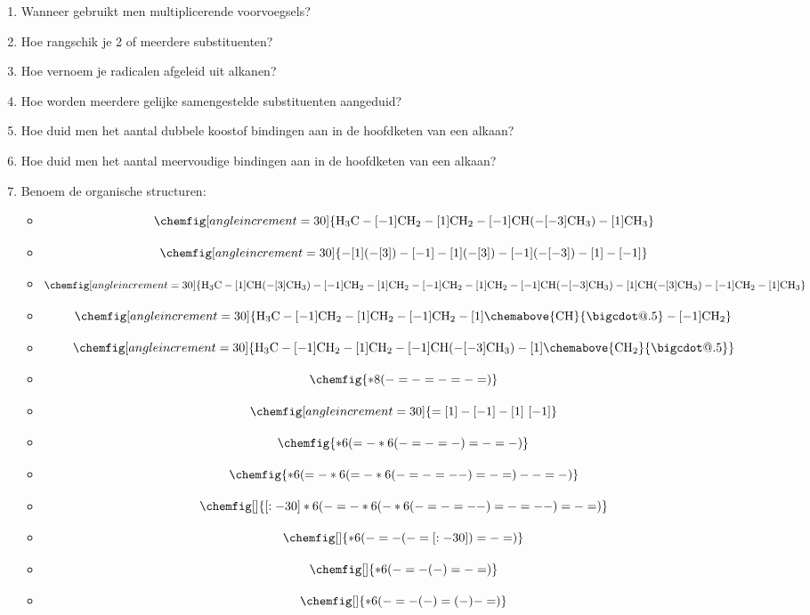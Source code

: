 \documentclass[a4paper,12pt]{article}
\makeatletter
\newcommand*\bigcdot{\mathpalette\bigcdot@{.5}}
\newcommand*\bigcdot@[2]{\mathbin{\vcenter{\hbox{\scalebox{#2}{$\m@th#1\bullet$}}}}}
\makeatother
\begin{document}
\begin{enumerate}
        \item Wanneer gebruikt men multiplicerende voorvoegsels?
        \item Hoe rangschik je 2 of meerdere substituenten?
        \item Hoe vernoem je radicalen afgeleid uit alkanen?
        \item Hoe worden meerdere gelijke samengestelde substituenten aangeduid? 
        \item Hoe duid men het aantal dubbele koostof bindingen aan in de hoofdketen van een alkaan?
        \item Hoe duid men het aantal meervoudige bindingen aan in de hoofdketen van een alkaan? 
        \item Benoem de organische structuren:
            \begin{itemize}
                \item $$\chemfig[angle increment=30]{\ce{H3C}-[-1]\ce{CH2}-[1]\ce{CH2}-[-1]\ce{CH}(-[-3]\ce{CH3})-[1]\ce{CH3}}$$
                \item $$\chemfig[angle increment=30]{-[1](-[3])-[-1]-[1](-[3])-[-1](-[-3])-[1]-[-1]}$$
                \item $$\chemfig[angle increment=30]{\ce{H3C}-[1]\ce{CH}(-[3]\ce{CH3})-[-1]\ce{CH2}-[1]\ce{CH2}-[-1]\ce{CH2}-[1]\ce{CH2}-[-1]\ce{CH}(-[-3]\ce{CH3})-[1]\ce{CH}(-[3]\ce{CH3})-[-1]\ce{CH2}-[1]\ce{CH3}}$$
                \item $$\chemfig[angle increment=30]{\ce{H3C}-[-1]\ce{CH2}-[1]\ce{CH2}-[-1]\ce{CH2}-[1]\chemabove{\ce{CH}}{\bigcdot}-[-1]\ce{CH2}}$$
                \item $$\chemfig[angle increment=30]{\ce{H3C}-[-1]\ce{CH2}-[1]\ce{CH2}-[-1]\ce{CH}(-[-3]\ce{CH3})-[1]\chemabove{\ce{CH2}}{\bigcdot}}$$
                \item $$\chemfig{*8(-=-=-=-=)}$$
                \item $$\chemfig[angle increment=30]{=[1]-[-1]-[1]~[-1]}$$
                \item $$\chemfig{*6(=-*6(-=-=-)=-=-)}$$
                \item $$\chemfig{*6(=-*6(=-*6(-=-=--)=-=)--=-)}$$
                \item $$\chemfig[]{[:-30]*6(-=-*6(-*6(-=-=--)=-=--)=-=)}$$
                \item $$\chemfig[]{*6(-=-(-=[:-30])=-=)}$$
                \item $$\chemfig[]{*6(-=-(-)=-=)}$$
                \item $$\chemfig[]{*6(-=-(-)=(-)-=)}$$

\end{itemize}
\end{enumerate}
\end{document}
